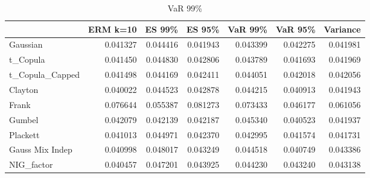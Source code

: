 \begin{table}
\begin{tabular}{lrrrrrr}
\toprule
{} &  ERM k=10 &    ES 99\% &    ES 95\% &   VaR 99\% &   VaR 95\% &  Variance \\
\midrule
Gaussian        &  \color{blue}0.041327 &  0.044416 &  0.041943 &  0.043399 &  0.042275 &  0.041981 \\
t\_Copula        &  \color{blue}0.041450 &  0.044830 &  0.042806 &  0.043789 &  0.041693 &  0.041969 \\
t\_Copula\_Capped &  \color{blue}0.041498 &  0.044169 &  0.042411 &  0.044051 &  0.042018 &  0.042056 \\
Clayton         &  \color{blue}0.040022 &  0.044523 &  0.042878 &  0.044215 &  0.040913 &  0.041943 \\
Frank           &  0.076644 &  0.055387 &  0.081273 &  0.073433 &  \color{blue}0.046177 &  0.061056 \\
Gumbel          &  0.042079 &  0.042139 &  0.042187 &  0.045340 &  \color{blue}0.040523 &  0.041937 \\
Plackett        &  \color{blue}0.041013 &  0.044971 &  0.042370 &  0.042995 &  0.041574 &  0.041731 \\
Gauss Mix Indep &  0.040998 &  0.048017 &  0.043249 &  0.044518 &  \color{blue}0.040749 &  0.043386 \\
NIG\_factor      &  \color{blue}0.040457 &  0.047201 &  0.043925 &  0.044230 &  0.043240 &  0.043138 \\
\bottomrule
\end{tabular}
\caption{VaR 99\%}
\end{table}

